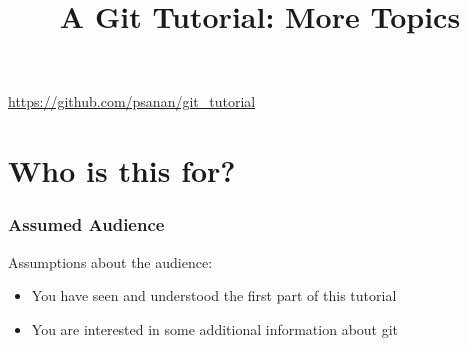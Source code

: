 

\title{A Git Tutorial: More Topics}
\subtitle[]{}
\date[]{}





\begin{frame}[fragile]
\titlepage
\begin{center}
\href{https://github.com/psanan/git_tutorial}{https://github.com/psanan/git\_tutorial}
\end{center}
\end{frame}


\begin{frame}
\tableofcontents
\end{frame}

\section{Who is this for?}
\begin{frame}[fragile]
\frametitle{Assumed Audience}
Assumptions about the audience:
\begin{itemize}
\item You have seen and understood the first part of this tutorial
\item You are interested in some additional information about git
\end{itemize}
\end{frame}

